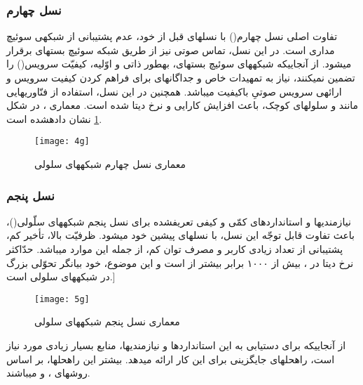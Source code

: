 \subsubsection{نسل چهارم}
 تفاوت اصلی نسل چهارم() با نسل\nf های قبل از خود، عدم پشتیبانی از شبکه\nf ی سوئیچ مداری است. در این نسل، تماس صوتی نیز از طریق شبکه سوئیچ بسته\nf ای برقرار می\nf شود. از آنجایی\nf که شبکه\nf های سوئیچ بسته\nf ای، به\nf  طور ذاتی و اوّلیه، کیفیّت سرویس() را تضمین نمی\nf کنند، نیاز به تمهیدات خاص و جداگانه\nf ای برای فراهم کردن کیفیت سرویس و ارائه\nf ی سرویس صوتیِ باکیفیت می\nf باشد. همچنین در این نسل، استفاده از فنّاوری\nf هایی مانند  و سلول\nf های کوچک، باعث افزایش کارایی و نرخ دیتا شده است. معماری ، در شکل \ref{4g} نشان داده\nf شده است\cite{cox}.
 \begin{figure}[H]
 \centering
 \texttt{[image: 4g]}
 \caption{معماری نسل چهارم شبکه\nf های سلولی}
 \label{4g}
 \end{figure}

 
\subsubsection{نسل پنجم}
نیازمندی\nf ها و استانداردهای کمّی و کیفی تعریف\nf شده برای نسل پنجم شبکه\nf های سلّولی()، باعث تفاوت قابل توجّه این نسل، با نسل\nf های پیشین خود می\nf شود. ظرفیّت بالا، تأخیر کم، پشتیبانی از تعداد زیادی کاربر و مصرف توان کم، از جمله این موارد می\nf باشد. حدّاکثر نرخ دیتا در ، بیش از ۱۰۰۰ برابر بیشتر از  است و این موضوع، خود بیانگر تحوّلی بزرگ در شبکه\nf های سلولی است.]
\begin{figure}[h]
\centering
\texttt{[image: 5g]}
\caption{معماری نسل پنجم شبکه\nf های سلولی}
\label{5g}
\end{figure}
از آنجایی\nf که برای دستیابی به این استانداردها و نیازمندی\nf ها،  منابع بسیار زیادی مورد نیاز است،  راه\nf حل\nf های جایگزینی برای این کار ارائه می\nf دهد. بیشتر این راه\nf حل\nf ها، بر اساس روش\nf های ، و  می\nf باشند.


